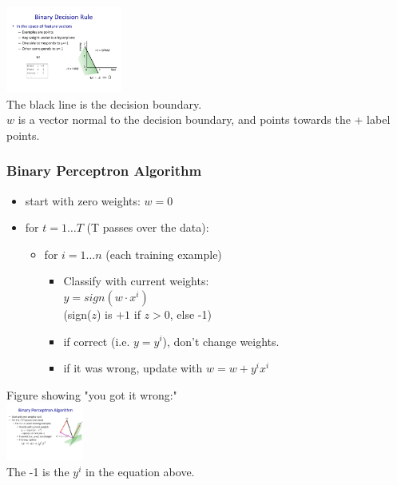  \includegraphics[width=1.5in]{figures/binary_decision_rule.pdf} \hfill \\
 The black line is the decision boundary.     \hfill \\
 $w$ is a vector normal to the decision boundary, and points towards the + label points. 
 
 \subsubsection{Binary Perceptron Algorithm}
 \begin{itemize}
 	\item start with zero weights: $w=0$
	\item for $ t = 1 \dots T$ (T passes over the data):
		\begin{itemize}
			\item for $i = 1 \dots n$ (each training example)
			\begin{itemize}
				\item  Classify with current weights: \hfill \\
					$ y = sign(w \cdot x^i)$ \hfill \\
					(sign($z$)  is $+1$ if $z > 0$, else -1) \hfill \\
				\item if correct (i.e. $y = y^i$), don't change weights.
				\item if it was wrong, update with $w = w + y^i x^i$
			\end{itemize}
		\end{itemize}
 \end{itemize}
Figure showing "you got it wrong:"  \hfill \\
 \includegraphics[width=1.0in]{figures/binary_perceptron_rule.pdf}  \hfill \\
 The -1 is the $y^i$ in the equation above.   \hfill \\
   \hfill \\
  
